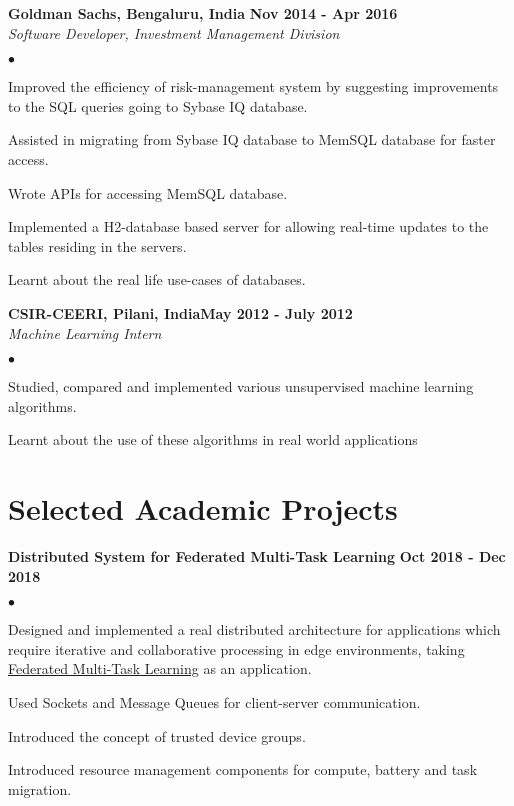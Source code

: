\documentclass[margin,line]{res}
\newenvironment{list2}{
  \begin{list}{$\bullet$}{%
      \setlength{\itemsep}{0in}
      \setlength{\parsep}{0in} \setlength{\parskip}{0in}
      \setlength{\topsep}{0in} \setlength{\partopsep}{0in} 
      \setlength{\leftmargin}{0.2in}}}{\end{list}}
\begin{document}
\begin{resume}
{\bf Goldman Sachs, Bengaluru, India} \hfill {\bf Nov 2014 - Apr 2016}\\
{\em Software Developer, Investment Management Division}
\vspace{.3cm}
\begin{list2}
	\item Improved the efficiency of risk-management system by suggesting improvements to the SQL
	queries going to Sybase IQ database.
	\item Assisted in migrating from Sybase IQ database to MemSQL database for faster access.
	\item Wrote APIs for accessing MemSQL database.
	\item Implemented a H2-database based server for allowing real-time updates to the tables residing in
	the servers.
	\item Learnt about the real life use-cases of databases.
\end{list2}

{\bf CSIR-CEERI, Pilani, India}\hfill {\bf May 2012 - July 2012}\\
{\em Machine Learning Intern}
\vspace{.3cm}
\begin{list2}
	\item Studied, compared and implemented various unsupervised machine learning algorithms.
	\item Learnt about the use of these algorithms in real world applications
\end{list2}


\section{\sc Selected Academic Projects}
{\bf Distributed System for Federated Multi-Task Learning} \hfill {\bf Oct 2018 - Dec 2018}\\

\vspace{-.3cm}
\begin{list2}
	\item Designed and implemented a real distributed architecture for applications which require iterative and collaborative processing in edge environments, taking \href{https://www.cs.cmu.edu/~atalwalk/flearn_nips.pdf}{\color{blue}Federated Multi-Task Learning} as an application.
	\item Used Sockets and Message Queues for client-server communication.
	\item Introduced the concept of trusted device groups.
	\item Introduced resource management components for compute, battery and task migration.
\end{list2}


\end{resume}
\end{document}
